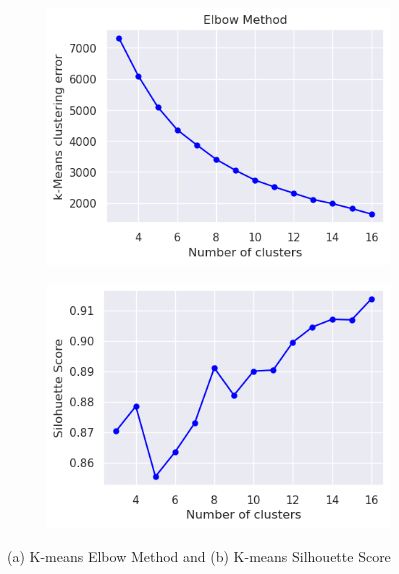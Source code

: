         \begin{figure}[H]
            \centering
            \begin{subfigure}[c]{0.47\textwidth}
                \centering
                \includegraphics[width=\textwidth]{../figures/plots/section3/k-means_clustering_error.png}
                \label{fig:tsne_kmeans}
            \end{subfigure}
            \hfill
            \begin{subfigure}[c]{0.47\textwidth}
                \centering
                \includegraphics[width=\textwidth]{../figures/plots/section3/k-means_silohuette_score.png}
                \label{fig:tsne_gmm}
            \end{subfigure}
            \vspace{-0.5cm}
            \caption{(a) K-means Elbow Method and (b) K-means Silhouette Score}
            \label{fig:}
        \end{figure}
        

